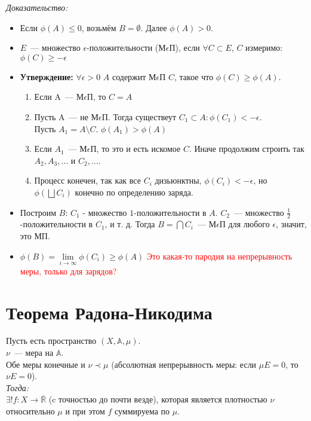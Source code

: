 \documentclass[paper=a4, fontsize=14pt]{report}
\begin{document}
\emph{Доказательство: }
		\begin{itemize}
			\item Если $\phi(A) \leq 0$, возьмём $B = \emptyset$. Далее $\phi(A) > 0$.
			\item $E$~--- множество $\epsilon$-положительности (М$\epsilon$П), если  $\forall C \subset E$, $C$ измеримо: $\phi(C) \geq -\epsilon$
			\item \textbf{Утверждение:} $\forall \epsilon>0$ $A$ содержит М$\epsilon$П $C$, такое что $\phi(C) \geq \phi(A)$.
			\begin{enumerate}
				\item Если A~--- М$\epsilon$П, то $C = A$
				\item Пусть A~--- не М$\epsilon$П. Тогда существеут $C_1 \subset A : \phi(C_1) < -\epsilon$.\\
                Пусть $A_1 = A \setminus C$. $\phi(A_1) > \phi(A)$\\
                \item Если $A_1$~--- М$\epsilon$П, то это и есть искомое $C$. Иначе продолжим строить так $A_2,A_3,\dots$ и $C_2,\dots$.
				\item Процесс конечен, так как все $C_i$ дизьюнктны, $\phi(C_i) < -\epsilon$, но $\phi(\bigsqcup C_i)$ конечно по определению заряда.
			\end{enumerate}
			\item Построим $B$: $C_1$ - множество $1$-положительности в $A$. $C_2$~--- множество $\frac{1}{2}$-положительности в $C_1$, и т. д.
                Тогда $B = \bigcap C_i$~--- М$\epsilon$П для любого $\epsilon$, значит, это МП.
			\item $\phi(B) = \lim\limits_{i \rightarrow \infty} \phi(C_i) \geq \phi(A)$
                \textcolor{red}{Это какая-то пародия на непрерывность меры, только для зарядов?}
\end{itemize}

\section{Теорема Радона-Никодима}
	Пусть есть пространство $(X, \mathbb{A}, \mu)$. \\
	$\nu$~--- мера на $\mathbb{A}$. \\
	Обе меры конечные и $\nu \prec \mu$ (абсолютная непрерывность меры: если $\mu E = 0$, то $\nu E = 0$). \\
	\emph{Тогда: } \\
		$\exists! f: X \rightarrow \overline{\mathds{R}}$ (c точностью до почти везде), которая является плотностью $\nu$ относительно $\mu$ и при этом $f$ суммируема по $\mu$.
\end{document}
